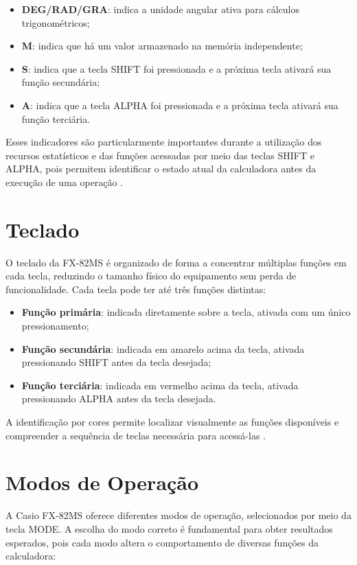 \begin{itemize}
    \item \textbf{DEG/RAD/GRA}: indica a unidade angular ativa para 
    cálculos trigonométricos;
    \item \textbf{M}: indica que há um valor armazenado na memória 
    independente;
    \item \textbf{S}: indica que a tecla SHIFT foi pressionada 
    e a próxima tecla ativará sua função secundária;
    \item \textbf{A}: indica que a tecla ALPHA foi pressionada 
    e a próxima tecla ativará sua função terciária.
\end{itemize}

Esses indicadores são particularmente importantes durante a utilização dos recursos estatísticos e das funções acessadas por meio das teclas SHIFT e ALPHA, pois permitem identificar o estado atual da calculadora antes da execução de uma operação \cite{casio2004}.

\section{Teclado}

O teclado da FX-82MS é organizado de forma a concentrar múltiplas funções em cada tecla, reduzindo o tamanho físico do equipamento sem perda de funcionalidade. Cada tecla pode ter até três funções distintas:

\begin{itemize}
    \item \textbf{Função primária}: indicada diretamente sobre a tecla, 
    ativada com um único pressionamento;
    \item \textbf{Função secundária}: indicada em amarelo acima da tecla, 
    ativada pressionando SHIFT antes da tecla desejada;
    \item \textbf{Função terciária}: indicada em vermelho acima da tecla, 
    ativada pressionando ALPHA antes da tecla desejada.
\end{itemize}

A identificação por cores permite localizar visualmente as funções disponíveis e compreender a sequência de teclas necessária para acessá-las \cite{casio2004}.

\section{Modos de Operação}

A Casio FX-82MS oferece diferentes modos de operação, selecionados por meio da tecla MODE. A escolha do modo correto é fundamental para obter resultados esperados, pois cada modo altera o comportamento de diversas funções da calculadora:

